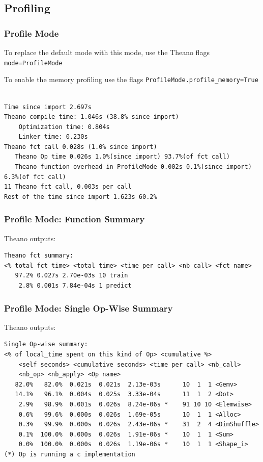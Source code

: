 \documentclass[a4paper,9pt]{beamer}
\begin{document}
\subsection{Profiling}
\begin{frame}[fragile]
\frametitle{Profile Mode}
To replace the default mode with this mode, use the Theano flags \texttt{mode=ProfileMode}

To enable the memory profiling use the flags \texttt{ProfileMode.profile\_memory=True} 
\begin{Verbatim}

Time since import 2.697s
Theano compile time: 1.046s (38.8% since import)
    Optimization time: 0.804s
    Linker time: 0.230s
Theano fct call 0.028s (1.0% since import)
   Theano Op time 0.026s 1.0%(since import) 93.7%(of fct call)
   Theano function overhead in ProfileMode 0.002s 0.1%(since import) 6.3%(of fct call)
11 Theano fct call, 0.003s per call
Rest of the time since import 1.623s 60.2%
\end{Verbatim}
\end{frame}

\begin{frame}[fragile]
\frametitle{Profile Mode: Function Summary}
Theano outputs:
\vfill
\begin{Verbatim}
Theano fct summary:
<% total fct time> <total time> <time per call> <nb call> <fct name>
   97.2% 0.027s 2.70e-03s 10 train
    2.8% 0.001s 7.84e-04s 1 predict
\end{Verbatim}
\end{frame}

\begin{frame}[fragile]
\frametitle{Profile Mode: Single Op-Wise Summary}
Theano outputs:
\vfill
\begin{Verbatim}
Single Op-wise summary:
<% of local_time spent on this kind of Op> <cumulative %> 
    <self seconds> <cumulative seconds> <time per call> <nb_call>
    <nb_op> <nb_apply> <Op name>
   82.0%   82.0%  0.021s  0.021s  2.13e-03s      10  1  1 <Gemv>
   14.1%   96.1%  0.004s  0.025s  3.33e-04s      11  1  2 <Dot>
    2.9%   98.9%  0.001s  0.026s  8.24e-06s *    91 10 10 <Elemwise>
    0.6%   99.6%  0.000s  0.026s  1.69e-05s      10  1  1 <Alloc>
    0.3%   99.9%  0.000s  0.026s  2.43e-06s *    31  2  4 <DimShuffle>
    0.1%  100.0%  0.000s  0.026s  1.91e-06s *    10  1  1 <Sum>
    0.0%  100.0%  0.000s  0.026s  1.19e-06s *    10  1  1 <Shape_i>
(*) Op is running a c implementation
\end{Verbatim}
\end{frame}
\end{document}
